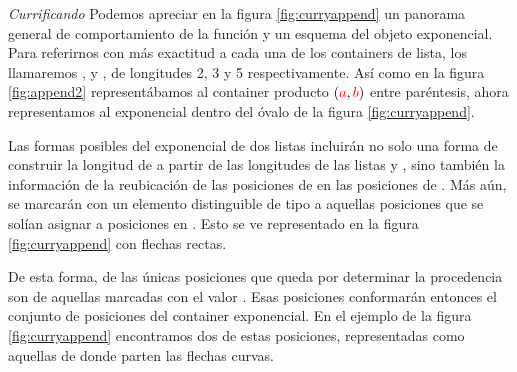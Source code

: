 \begin{example} {\it Currificando}
Podemos apreciar en la figura \ref{fig:curryappend} un panorama general de comportamiento de la función  y un esquema del objeto exponencial. Para referirnos con más exactitud a cada una de los containers de lista, los llamaremos ,  y , de longitudes 2, 3 y 5 respectivamente. Así como en la figura \ref{fig:append2} representábamos al container producto $(\textcolor{red}{a},\textcolor{red}{b})$ entre paréntesis, ahora representamos al exponencial dentro del óvalo de la figura \ref{fig:curryappend}.

Las formas posibles del exponencial de dos listas incluirán no solo una forma de construir la longitud de  a partir de las longitudes de las listas  y , sino también la información de la reubicación de las posiciones de  en las posiciones de . Más aún, se marcarán con un elemento distinguible  de tipo \AgdaDatatype{$\top$} a aquellas posiciones que se solían asignar a posiciones en . Esto se ve representado en la figura \ref{fig:curryappend} con flechas rectas.

De esta forma, de las únicas posiciones que queda por determinar la procedencia son de aquellas marcadas con el valor . Esas posiciones conformarán entonces el conjunto de posiciones del container exponencial. En el ejemplo de la figura \ref{fig:curryappend} encontramos dos de estas posiciones, representadas como aquellas de donde parten las flechas curvas.


\end{example}

